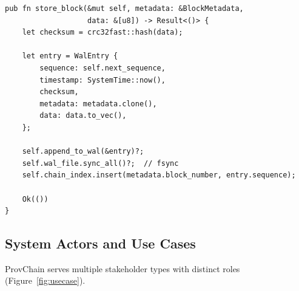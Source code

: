 \documentclass[preprint,review,12pt,authoryear]{elsarticle}
\begin{document}
\begin{lstlisting}[caption={WAL Persistence (Rust)}, label={lst:persist}, basicstyle=\ttfamily\scriptsize]
pub fn store_block(&mut self, metadata: &BlockMetadata, 
                   data: &[u8]) -> Result<()> {
    let checksum = crc32fast::hash(data);
    
    let entry = WalEntry {
        sequence: self.next_sequence,
        timestamp: SystemTime::now(),
        checksum,
        metadata: metadata.clone(),
        data: data.to_vec(),
    };
    
    self.append_to_wal(&entry)?;
    self.wal_file.sync_all()?;  // fsync
    self.chain_index.insert(metadata.block_number, entry.sequence);
    
    Ok(())
}
\end{lstlisting}

\subsection{System Actors and Use Cases}

ProvChain serves multiple stakeholder types with distinct roles (Figure~\ref{fig:usecase}).
\end{document}
